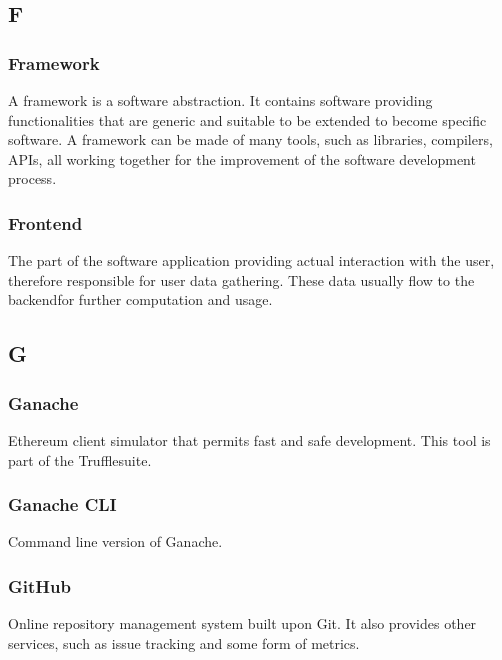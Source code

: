 \subsection*{F}

\subsubsection*{Framework}
A framework is a software abstraction. It contains software providing functionalities that are generic and suitable to be extended to become specific software. A framework can be made of many tools, such as libraries, compilers, APIs\glo, all working together for the improvement of the software development process.

\subsubsection*{Frontend}
The part of the software application providing actual interaction with the user, therefore responsible for user data gathering. These data usually flow to the backend\glosp for further computation and usage.


\subsection*{G}

\subsubsection*{Ganache}
Ethereum client simulator that permits fast and safe development. This tool is part of the Truffle\glosp suite.

\subsubsection*{Ganache CLI}
Command line version of Ganache.

\subsubsection*{GitHub}
Online repository management system built upon Git. It also provides other services, such as issue tracking and some form of metrics.


